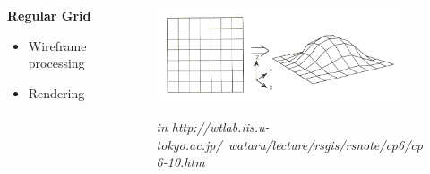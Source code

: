 \documentclass[aspectratio=169]{beamer}
\newenvironment{myframe}[1][t]{\begin{frame}[#1]{\secname}{\subsecname}}{\end{frame}}
\begin{document}
	
	\begin{myframe}
		\begin{columns}[T]
			\begin{column}{0.45 \linewidth}
				\textbf{Regular Grid}
				\begin{itemize}
					\item Wireframe processing
					\item Rendering
				\end{itemize}
			\end{column}
			\begin{column}{0.45 \linewidth}
				\begin{figure}[c]
					\hspace{-0.95cm}
					\includegraphics[height=7.6em]{images/background/representation/grid} \\
					\hspace{-0.65cm}
					\parbox{1.05\linewidth}{\tiny\textit{in http://wtlab.iis.u-tokyo.ac.jp/~wataru/lecture/rsgis/rsnote/cp6/cp6-10.htm}}
				\end{figure}
			\end{column}
		\end{columns}
	\end{myframe}
	
\end{document}
